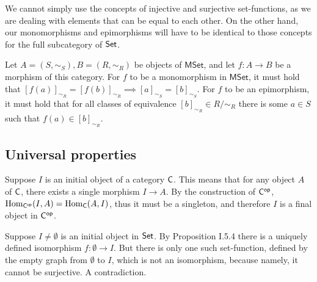 \begin{problem}
\end{problem}

\begin{solution}
	We cannot simply use the concepts of injective and surjective set-functions, as we are dealing with elements that can be equal to each other. On the other hand, our monomorphisms and epimorphisms will have to be identical to those concepts for the full subcategory of $\mathsf{Set}$.
	
	Let $A = (S, \sim_S), B = (R, \sim_R)$ be objects of $\mathsf{MSet}$, and let $f: A \to B$ be a morphism of this category. For $f$ to be a monomorphism in $\mathsf{MSet}$, it must hold that $[f(a)]_{\sim_R} = [f(b)]_{\sim_R} \implies [a]_{\sim_S} = [b]_{\sim_S}$. For $f$ to be an epimorphism, it must hold that for all classes of equivalence $[b]_{\sim_R} \in R/\sim_R$ there is some $a \in S$ such that $f(a) \in [b]_{\sim_R}$.
\end{solution}

\subsection{Universal properties}

\begin{problem}
\end{problem}

\begin{solution}
	Suppose $I$ is an initial object of a category $\mathsf{C}$. This means that for any object $A$ of $\mathsf{C}$, there exists a single morphism $I \to A$. By the construction of $\mathsf{C^{op}}$, $\mathrm{Hom}_{\mathsf{C^{op}}}(I,A) = \mathrm{Hom}_{\mathsf{C}}(A,I)$, thus it must be a singleton, and therefore $I$ is a final object in $\mathsf{C^{op}}$.
\end{solution}

\begin{problem}
\end{problem}

\begin{solution}
	Suppose $I \neq \emptyset$ is an initial object in $\mathsf{Set}$. By Proposition I.5.4 there is a uniquely defined isomorphism $f: \emptyset \to I$. But there is only one such set-function, defined by the empty graph from $\emptyset$ to $I$, which is not an isomorphism, because namely, it cannot be surjective. A contradiction.
\end{solution}

\begin{problem}
\end{problem}

